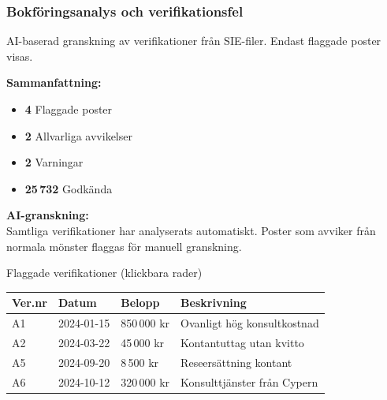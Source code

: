 \documentclass[10pt]{beamer}
\begin{document}
\begin{frame}[label=bokanalys]
  \frametitle{Bokföringsanalys och verifikationsfel}
  \small
  AI-baserad granskning av verifikationer från SIE-filer. Endast flaggade poster visas.
  
  \vspace{0.4cm}
  \begin{minipage}{0.48\textwidth}
    \textbf{Sammanfattning:}\\
    \vspace{0.2cm}
    \begin{itemize}
      \item \textbf{4} Flaggade poster
      \item \textbf{2} Allvarliga avvikelser
      \item \textbf{2} Varningar
      \item \textbf{25\,732} Godkända
    \end{itemize}
  \end{minipage}
  \hfill
  \begin{minipage}{0.48\textwidth}
    \textbf{AI-granskning:}\\
    \vspace{0.2cm}
    \footnotesize
    Samtliga verifikationer har analyserats automatiskt. Poster som avviker från normala mönster flaggas för manuell granskning.
  \end{minipage}
  
  \vspace{0.5cm}
  \begin{block}{Flaggade verifikationer (klickbara rader)}
    \footnotesize
    \begin{tabular}{|l|l|l|p{4.5cm}|}
      \hline
      \textbf{Ver.nr} & \textbf{Datum} & \textbf{Belopp} & \textbf{Beskrivning} \\
      \hline
      A1 & 2024-01-15 & 850\,000 kr & Ovanligt hög konsultkostnad \\
      \hline
      A2 & 2024-03-22 & 45\,000 kr & Kontantuttag utan kvitto \\
      \hline
      A5 & 2024-09-20 & 8\,500 kr & Reseersättning kontant \\
      \hline
      A6 & 2024-10-12 & 320\,000 kr & Konsulttjänster från Cypern \\
      \hline
    \end{tabular}
  \end{block}
  

\end{frame}
\end{document}
